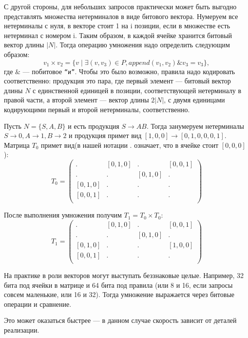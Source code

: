 \medskip

С другой стороны, для небольших запросов практически может быть выгодно представлять множества нетерминалов в виде битового вектора.
Нумеруем все нетерминалы с нуля, в векторе стоит 1 на i позиции, если в множестве есть нетерминал с номером i.
Таким образом, в каждой ячейке хранится битовый вектор длины $|N|$.
Тогда операцию умножения надо определить следующим образом:
$$v_1 \times v_2 = \{v \mid \exists (v,v_3) \in P, \textit{append}(v_1, v_2) \& v_3 = v_3\},$$ где $\&$ --- побитовое \texttt{``и''}.
Чтобы это было возможно, правила надо кодировать соответственно: продукция это пара, где первый элемент --- битовый вектор длины $N$ с единственной единицей в позиции, соответствующей нетерминалу в правой части, а второй элемент --- вектор длины $2|N|$, с двумя единицами кодирующими первый и второй нетерминалы, соответственно.

\begin{example}
Пусть $N = \{S, A, B\}$ и есть продукция $S \to A B$. Тогда занумеруем нетерминалы $ S \to 0, A \to 1, B \to 2$ и продукция примет вид $[1, 0, 0] \to [0, 1, 0, 0, 0, 1]$. Матрица $T_0$ примет вид(в нашей нотации $.$ означает, что в ячейке стоит $[0,0,0]$):
\[
T_0 = \begin{pmatrix}
. & [0,1,0]       & . & [0,0,1]       \\
. & . & [0,1,0]       & . \\
[0,1,0]       & . & . & . \\
[0,0,1]      & . & . & . \\
\end{pmatrix}
\]

После выполнения умножения получим $T_1 = T_0 \times T_0$:
\[
T_1 = \begin{pmatrix}
. & [0,1,0]       & . & [0,0,1]       \\
. & . & [0,1,0]       & . \\
[0,1,0]       & . & . & [1,0,0] \\
[0,0,1]      & . & . & . \\
\end{pmatrix}
\]
\end{example}


На практике в роли векторов могут выступать беззнаковые целые. 
Например, 32 бита под ячейки в матрице и 64 бита под правила (или 8 и 16, если запросы совсем маленькие, или 16 и 32).
Тогда умножение выражается через битовые операции и сравнение.



Это может оказаться быстрее --- в данном случае скорость зависит от деталей реализации.

